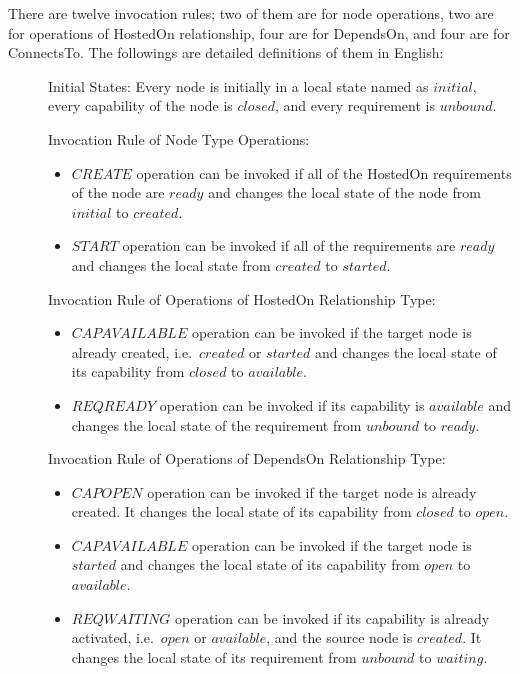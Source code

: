 \documentclass[12pt]{report}
\begin{document}
There are twelve invocation rules; two of them are for node
operations, two are for operations of HostedOn relationship, four are
for DependsOn, and four are for ConnectsTo. The followings are
detailed definitions of them in English:
\begin{description}
\item[]Initial States: Every node is initially in a local state named
  as $initial$, every capability of the node is $closed$, and every
  requirement is $unbound$.
\item[] Invocation Rule of Node Type Operations:
  \begin{itemize}
  \item $CREATE$ operation can be invoked if all of the HostedOn
    requirements of the node are $ready$ and changes the local state of the node from
    $initial$ to $created$.
  \item $START$ operation can be invoked if all of the requirements
    are $ready$ and changes the local state from $created$ to $started$.
  \end{itemize}
\item[] Invocation Rule of Operations of HostedOn Relationship Type:
  \begin{itemize}
  \item $CAPAVAILABLE$ operation can be invoked if the target node is
    already created, i.e.\ $created$ or $started$ and changes the local state
    of its capability from $closed$ to $available$.
  \item $REQREADY$ operation can be invoked if its capability is
    $available$ and changes the local state of the requirement from $unbound$
    to $ready$.
  \end{itemize}
\item[] Invocation Rule of Operations of DependsOn Relationship Type:
  \begin{itemize}
  \item $CAPOPEN$ operation can be invoked if the target node is
    already created. It changes the local state of its capability from
    $closed$ to $open$.
  \item $CAPAVAILABLE$ operation can be invoked if the target node is
    $started$ and changes the local state of its capability from
    $open$ to $available$.
  \item $REQWAITING$ operation can be invoked if its capability is already
    activated, i.e.\ $open$ or $available$, and the source node is
    $created$. It changes the local state of its requirement from
    $unbound$ to $waiting$.

\end{itemize}
\end{description}
\end{document}
